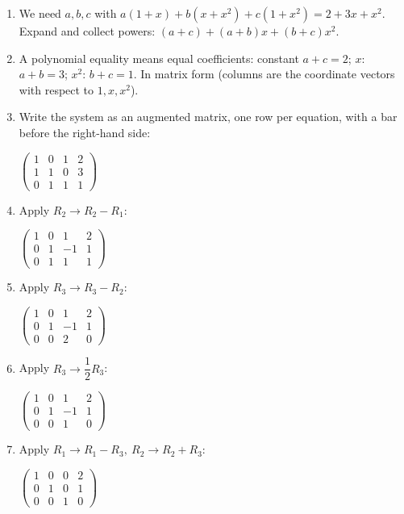 \documentclass[11pt]{article}
\begin{document}
\begin{tcolorbox}[breakable,colback=ans,colframe=ansb,boxrule=0.5pt,left=4pt,right=4pt,top=2pt,bottom=2pt]\begin{enumerate}[leftmargin=2.2em,itemsep=1pt,topsep=1pt,label=\textbf{Step \arabic*.}]\item We need $a,b,c$ with $a(1+x)+b(x+x^{2})+c(1+x^{2})=2+3x+x^{2}$. Expand and collect powers: $(a+c)+(a+b)x+(b+c)x^{2}$.
\item A polynomial equality means equal coefficients: constant $a+c=2$; $x$: $a+b=3$; $x^{2}$: $b+c=1$. In matrix form (columns are the coordinate vectors with respect to $1,x,x^{2}$).
\item Write the system as an augmented matrix, one row per equation, with a bar before the right-hand side:\par\smallskip $\displaystyle \left(\begin{array}{ccc|c}1 & 0 & 1 & 2 \\ 1 & 1 & 0 & 3 \\ 0 & 1 & 1 & 1\end{array}\right)$
\item Apply $R_2\to R_2-R_1$:\par\smallskip $\displaystyle \left(\begin{array}{ccc|c}1 & 0 & 1 & 2 \\ 0 & 1 & -1 & 1 \\ 0 & 1 & 1 & 1\end{array}\right)$
\item Apply $R_3\to R_3-R_2$:\par\smallskip $\displaystyle \left(\begin{array}{ccc|c}1 & 0 & 1 & 2 \\ 0 & 1 & -1 & 1 \\ 0 & 0 & 2 & 0\end{array}\right)$
\item Apply $R_3\to \dfrac{1}{2} R_3$:\par\smallskip $\displaystyle \left(\begin{array}{ccc|c}1 & 0 & 1 & 2 \\ 0 & 1 & -1 & 1 \\ 0 & 0 & 1 & 0\end{array}\right)$
\item Apply $R_1\to R_1-R_3,\ R_2\to R_2+R_3$:\par\smallskip $\displaystyle \left(\begin{array}{ccc|c}1 & 0 & 0 & 2 \\ 0 & 1 & 0 & 1 \\ 0 & 0 & 1 & 0\end{array}\right)$

\end{enumerate}
\end{tcolorbox}
\end{document}
